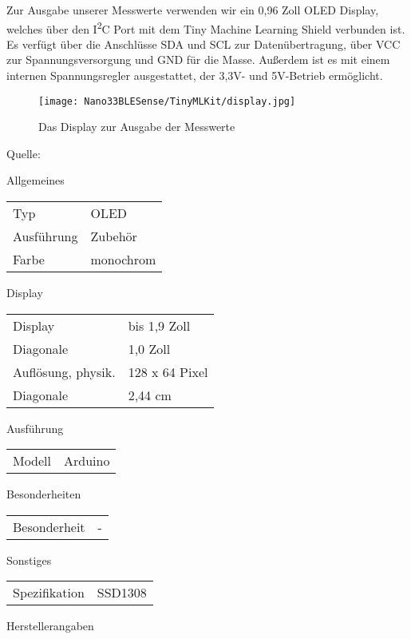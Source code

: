 Zur Ausgabe unserer Messwerte verwenden wir ein 0,96 Zoll OLED Display, welches über den I\textsuperscript{2}C Port mit dem Tiny Machine Learning Shield verbunden ist. Es verfügt über die Anschlüsse SDA und SCL zur Datenübertragung, über VCC zur Spannungsversorgung und GND für die Masse. Außerdem ist es mit einem internen Spannungsregler ausgestattet, der 3,3V- und 5V-Betrieb ermöglicht.

\begin{figure}[H]
    \centering
    \texttt{[image: Nano33BLESense/TinyMLKit/display.jpg]}
    \caption{Das Display zur Ausgabe der Messwerte}
\end{figure}

Quelle: 


\bigskip

Allgemeines

\begin{tabular}{ll}
Typ  & OLED \\
Ausführung &  Zubehör \\
Farbe  & monochrom \\
\end{tabular}
Display

\begin{tabular}{ll}
Display  & bis 1,9 Zoll \\
Diagonale  & 1,0 Zoll \\
Auflösung, physik. &  128 x 64 Pixel \\
Diagonale  & 2,44 cm \\
\end{tabular}

Ausführung
\begin{tabular}{ll}
Modell  & Arduino \\
\end{tabular}
Besonderheiten

\begin{tabular}{ll}
Besonderheit  & - \\
\end{tabular}

Sonstiges
\begin{tabular}{ll}
Spezifikation &  SSD1308 \\
\end{tabular}

Herstellerangaben

